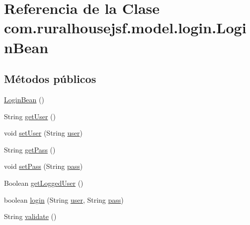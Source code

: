 \hypertarget{classcom_1_1ruralhousejsf_1_1model_1_1login_1_1_login_bean}{}\section{Referencia de la Clase com.\+ruralhousejsf.\+model.\+login.\+Login\+Bean}
\label{classcom_1_1ruralhousejsf_1_1model_1_1login_1_1_login_bean}
\subsection*{Métodos públicos}
\begin{DoxyCompactItemize}
\item 
\mbox{\hyperlink{classcom_1_1ruralhousejsf_1_1model_1_1login_1_1_login_bean_ae77b2f684ab6b7fc6f4fd4274ccd2c84}{Login\+Bean}} ()
\item 
String \mbox{\hyperlink{classcom_1_1ruralhousejsf_1_1model_1_1login_1_1_login_bean_ab0769180b1eaf69f94f0aa181fc2dd40}{get\+User}} ()
\item 
void \mbox{\hyperlink{classcom_1_1ruralhousejsf_1_1model_1_1login_1_1_login_bean_a87f309a4e8c32ad0246198b72ef45458}{set\+User}} (String \mbox{\hyperlink{classcom_1_1ruralhousejsf_1_1model_1_1login_1_1_login_bean_a06e00e34aacd95ab04a33bae5bc50b34}{user}})
\item 
String \mbox{\hyperlink{classcom_1_1ruralhousejsf_1_1model_1_1login_1_1_login_bean_ace5538b87e614420da9c6ce31a5c7cef}{get\+Pass}} ()
\item 
void \mbox{\hyperlink{classcom_1_1ruralhousejsf_1_1model_1_1login_1_1_login_bean_a5c0db493f5898894994d767564c9b493}{set\+Pass}} (String \mbox{\hyperlink{classcom_1_1ruralhousejsf_1_1model_1_1login_1_1_login_bean_a4abf487aa0d370809a4f737dd87dbdd7}{pass}})
\item 
Boolean \mbox{\hyperlink{classcom_1_1ruralhousejsf_1_1model_1_1login_1_1_login_bean_acfc1e8aa6bd2b829d5115a5dc7e8d3d6}{get\+Logged\+User}} ()
\item 
boolean \mbox{\hyperlink{classcom_1_1ruralhousejsf_1_1model_1_1login_1_1_login_bean_a1d87bc3b800e6c4a0b3986d7671334fd}{login}} (String \mbox{\hyperlink{classcom_1_1ruralhousejsf_1_1model_1_1login_1_1_login_bean_a06e00e34aacd95ab04a33bae5bc50b34}{user}}, String \mbox{\hyperlink{classcom_1_1ruralhousejsf_1_1model_1_1login_1_1_login_bean_a4abf487aa0d370809a4f737dd87dbdd7}{pass}})
\item 
String \mbox{\hyperlink{classcom_1_1ruralhousejsf_1_1model_1_1login_1_1_login_bean_ac3b4153fa4416dc62d107ae2005a9ee8}{validate}} ()
\end{DoxyCompactItemize}
